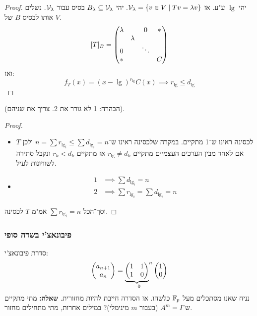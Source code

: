 \documentclass[name=רשימות אלגברה לינארית 2א]{../../../tex/classes/megasumPreamble}
\begin{document}
	
	\begin{proof}
		יהי $\lg$ ע"ע. אז $\mathcal{V}_{\lambda} = \{v \in V \mid Tv = \lambda v\}$. יהי $B_\lambda \subseteq \mathcal{V}_{\lambda}$ בסיס עבור $\mathcal{V}_{\lambda}$. נשלים אותו לבסיס $B$ של $V$. 
		\[ [T]_B = \begin{pmatrix} \lambda & & 0 & * \\ & \lambda &  & \\ 0 && \ddots & \\ *&&& C \end{pmatrix} \]
		ואז: 
		\[ f_T(x) = (x - \lg)^{r_\lg}C(x) \implies r_\lg \le d_\lg \]
	\end{proof}
	
	(הבהרה: 1 לא גורר את 2. צריך את שניהם). 
	
	\begin{proof}\,
		\begin{itemize}
			\item[$\impliedby$]$T$ לכסינה ראינו ש־1 מתקיים. במקרה שלכסינה ראינו ש־$n = \sum r_{\lg_i} \le \sum d_{\lg_i} = n$ ולכן אם לאחד מבין הערכים העצמיים מתקיים $r_\lg \neq d_k$ אז מתקיים $r_k < d_k$ ונקבל סתירה לשוויונות  לעיל. 
			\item[$\implies$] 
			\begin{align*}
				1 &\implies \sum d_{\lg_i} = n \\
				2 &\implies \sum r_{\lg_i} = \sum d_{\lg_i} = n
			\end{align*}
		\end{itemize}
		וסך־הכל $\sum r_{\lg_i} = n$ אמ"מ $T$ לכסינה. 
	\end{proof}
	
	\subsubsection{פיבונאצ'י בשדה סופי}
	סדרת פיבונאצ'י: 
	\[ \begin{pmatrix} a_{n + 1} \\ a_n \end{pmatrix} = {\underbrace{\begin{pmatrix} 1 & 1 \\ 1 & 0 \end{pmatrix}}_{ = 0}}^{n}\begin{pmatrix} 1 \\ 0 \end{pmatrix} \]
	נניח שאנו מסתכלים מעל $\mathbb{F}_p$ כלשהו. אז הסדרה חייבת להיות מחזורית. \textbf{שאלה: }מתי מתקיים ש־$A^m = I$ (בעבור $m$ מינימלי)? במילים אחרות, מתי מתחילים מחזור. 
	
\end{document}
